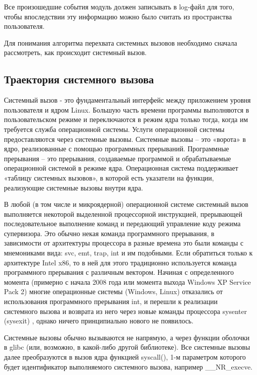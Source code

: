 \documentclass[a4paper,14pt]{article}
\begin{document}
Все произошедшие события модуль должен записывать в log-файл для того, чтобы впоследствии эту информацию можно было считать из пространства пользователя.

Для понимания алгоритма перехвата системных вызовов необходимо сначала рассмотреть, как происходит системный вызов.

\subsection{Траектория системного вызова}

Системный вызов - это фундаментальный интерфейс между приложением уровня пользователя и ядром Linux. Большую часть времени программы выполняются в пользовательском режиме и переключаются в режим ядра только тогда, когда им требуется служба операционной системы. Услуги операционной системы предоставляются через системные вызовы. Системные вызовы -- это «ворота» в ядро, реализованные с помощью программных прерываний. Программные прерывания -- это прерывания, создаваемые программой и обрабатываемые операционной системой в режиме ядра. Операционная система поддерживает «таблицу системных вызовов», в которой есть указатели на функции, реализующие системные вызовы внутри ядра.

В любой (в том числе и микроядерной) операционной системе системный вызов выполняется некоторой выделенной процессорной инструкцией, прерывающей последовательное выполнение команд и передающий управление коду режима супервизора. Это обычно некая команда программного прерывания, в зависимости от архитектуры процессора в разные времена это были команды с мнемониками вида: svc, emt, trap, int и им подобными. Если обратиться только к архитектуре Intel x86, то в ней для этого традиционно используется команда программного прерывания с различным вектором. Начиная с определенного момента (примерно с начала 2008 года или момента выхода Windows XP Service Pack 2) многие операционные системы (Windows, Linux) отказались от использования программного прерывания int, и перешли к реализации системного вызова и возврата из него через новые команды процессора sysenter (sysexit) \cite{zirulnik}, однако ничего принципиально нового не появилось.

Системные вызовы обычно вызываются не напрямую, а через функции оболочки в glibc (или, возможно, в какой-либо другой библиотеке). Все системные вызовы далее преобразуются в вызов ядра функцией syscall(), 1-м параметром которого будет идентификатор выполняемого системного вызова, например \_\_NR\_execve.
\end{document}

